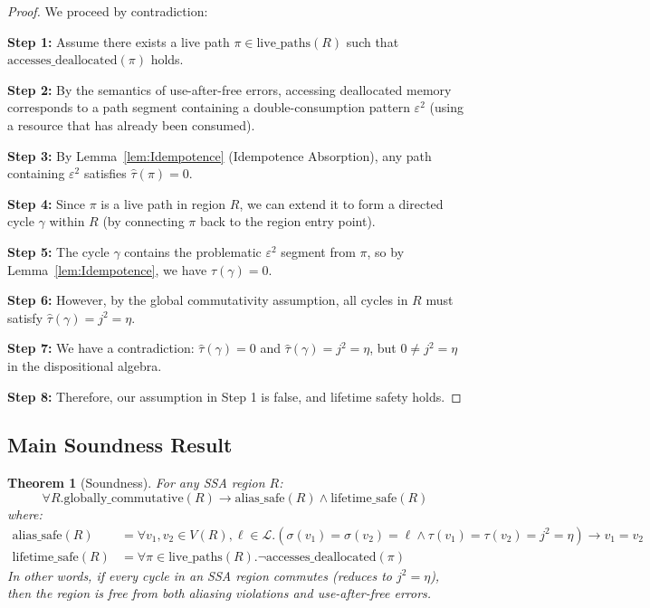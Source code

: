 \documentclass[acmsmall,anonymous,review,screen]{acmart}
\newtheorem{theorem}{Theorem}
\begin{document}
	\begin{proof}
		We proceed by contradiction:
		
		\textbf{Step 1:} Assume there exists a live path $\pi \in \text{live\_paths}(R)$ such that $\text{accesses\_deallocated}(\pi)$ holds.
		
		\textbf{Step 2:} By the semantics of use-after-free errors, accessing deallocated memory corresponds to a path segment containing a double-consumption pattern $\varepsilon^2$ (using a resource that has already been consumed).
		
		\textbf{Step 3:} By Lemma~\ref{lem:Idempotence} (Idempotence Absorption), any path containing $\varepsilon^2$ satisfies $\hat{\tau}(\pi) = 0$.
		
		\textbf{Step 4:} Since $\pi$ is a live path in region $R$, we can extend it to form a directed cycle $\gamma$ within $R$ (by connecting $\pi$ back to the region entry point).
		
		\textbf{Step 5:} The cycle $\gamma$ contains the problematic $\varepsilon^2$ segment from $\pi$, so by Lemma~\ref{lem:Idempotence}, we have $\hat{\tau}(\gamma) = 0$.
		
		\textbf{Step 6:} However, by the global commutativity assumption, all cycles in $R$ must satisfy $\hat{\tau}(\gamma) = j^{2} = \eta$.
		
		\textbf{Step 7:} We have a contradiction: $\hat{\tau}(\gamma) = 0$ and $\hat{\tau}(\gamma) = j^{2} = \eta$, but $0 \neq j^{2} = \eta$ in the dispositional algebra.
		
		\textbf{Step 8:} Therefore, our assumption in Step 1 is false, and lifetime safety holds.
	\end{proof}
	
	\subsection{Main Soundness Result}
	
	\begin{theorem}[Soundness]
		For any SSA region $R$:
		\begin{equation}
			\forall R.\text{globally\_commutative}(R) \to \text{alias\_safe}(R) \land \text{lifetime\_safe}(R)
		\end{equation}
		where:
		\begin{align}
			\text{alias\_safe}(R) &= \forall v_1, v_2 \in V(R), \ell \in \mathcal{L}.\left(\sigma(v_1) = \sigma(v_2) = \ell \land \tau(v_1) = \tau(v_2) = j^{2} = \eta\right) \to v_1 = v_2 \\
			\text{lifetime\_safe}(R) &= \forall\pi \in \text{live\_paths}(R).\neg\text{accesses\_deallocated}(\pi)
		\end{align}
		In other words, if every cycle in an SSA region commutes (reduces to $j^{2} = \eta$), then the region is free from both aliasing violations and use-after-free errors.
	\end{theorem}
	
\end{document}
